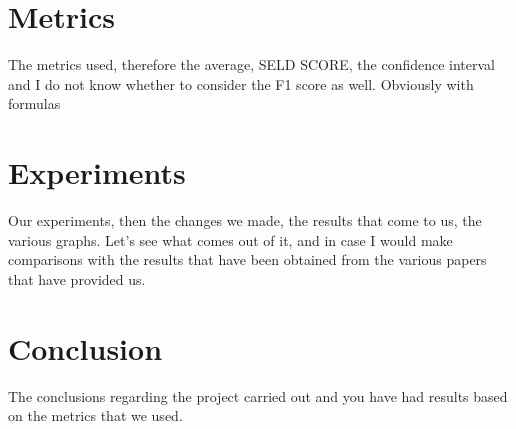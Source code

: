 \documentclass{article}
\begin{document}
    \section{Metrics}
    The metrics used, therefore the average, SELD SCORE, the confidence interval and I do not know whether to consider the F1 score as well. Obviously with formulas 
    \section{Experiments}
    Our experiments, then the changes we made, the results that come to us, the various graphs.
    Let's see what comes out of it, and in case I would make comparisons with the results that have been obtained from the various papers that have provided us.
    \section{Conclusion}
    The conclusions regarding the project carried out and you have had results based on the metrics that we used.
\end{document}
